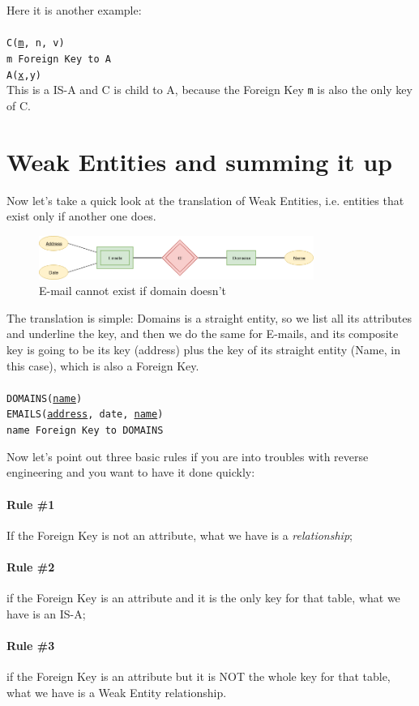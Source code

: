 \documentclass[class=book, crop=false, oneside]{standalone}
\newcommand\tab[1][1cm]{\hspace*{#1}}
\begin{document}
\vskip 5pt
Here it is another example:\\\\
\texttt{C(\underline{m}, n, v)}\\
\tab[.4cm] \texttt{m Foreign Key to A}\\
\texttt{A(\underline{x},y)}\\
\vskip 5pt
This is a IS-A and C is child to A, because the Foreign Key \texttt{m} is also the only key of C.

\section{Weak Entities and summing it up}
Now let's take a quick look at the translation of Weak Entities, i.e. entities that exist only if another one does.
\begin{figure}[H]
	\includegraphics[width=0.8\textwidth,keepaspectratio]{diagram4_00.png}
	\caption{E-mail cannot exist if domain doesn't}
	\label{diagram4_00}
\end{figure}
\vskip 5pt
The translation is simple: Domains is a straight entity, so we list all its attributes and underline the key, and then we do the same for E-mails, and its composite key is going to be its key (address) plus the key of its straight entity (Name, in this case), which is also a Foreign Key.\\\\
\texttt{DOMAINS(\underline{name})}\\
\texttt{EMAILS(\underline{address}, date, \underline{name})}\\
\tab[.4cm] \texttt{name Foreign Key to DOMAINS}
\vskip 5pt

Now let's point out three basic rules if you are into troubles with reverse engineering and you want to have it done quickly:
\paragraph{Rule \#1} If the Foreign Key is not an attribute, what we have is a \emph{relationship};
\paragraph{Rule \#2} if the Foreign Key is an attribute and it is the only key for that table, what we have is an IS-A;
\paragraph{Rule \#3} if the Foreign Key is an attribute but it is NOT the whole key for that table, what we have is a Weak Entity relationship.
\end{document}
